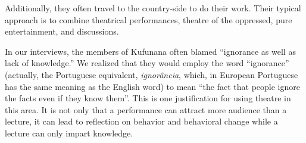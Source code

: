 \documentclass[article,twocolumn,twoside]{memoir}
\begin{document}
Additionally, they often travel to the country-side to do their work. Their
typical approach is to combine theatrical performances, theatre of the
oppressed, pure entertainment, and discussions.

In our interviews, the members of Kufunana often blamed ``ignorance as well as
lack of knowledge.'' We realized that they would employ the word ``ignorance''
(actually, the Portuguese equivalent, \textit{ignor\^{a}ncia}, which, in
European Portuguese has the same meaning as the English word) to mean ``the
fact that people ignore the facts even if they know them''. This is one
justification for using theatre in this area. It is not only that a performance
can attract more audience than a lecture, it can lead to reflection on behavior
and behavioral change while a lecture can only impart knowledge.
\end{document}
